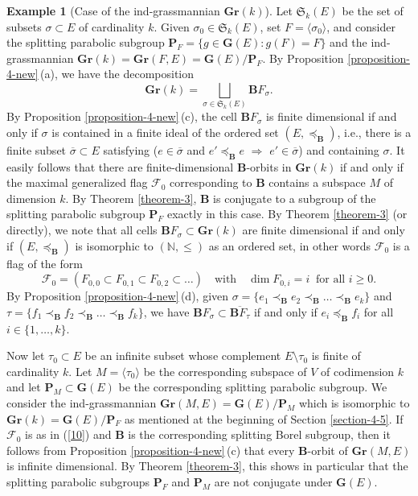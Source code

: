 \documentclass[12pt]{amsart}
\theoremstyle{definition}
\newtheorem{example}{Example}
\begin{document}
\begin{example}[Case of the ind-grassmannian $\mathbf{Gr}(k)$]
\label{example-2}
Let $\mathfrak{S}_k(E)$ be the set of subsets $\sigma\subset E$ of cardinality $k$.
Given $\sigma_0\in\mathfrak{S}_k(E)$,
set $F=\langle \sigma_0\rangle$, and consider the splitting parabolic subgroup $\mathbf{P}_F=\{g\in\mathbf{G}(E):g(F)=F\}$
and the ind-grassmannian $\mathbf{Gr}(k)=\mathbf{Gr}(F,E)=\mathbf{G}(E)/\mathbf{P}_F$.
 By Proposition \ref{proposition-4-new}\,{\rm (a)}, we have the decomposition
\[\mathbf{Gr}(k)=\bigsqcup_{\sigma\in\mathfrak{S}_k(E)}\mathbf{B}F_\sigma.\]
By Proposition \ref{proposition-4-new}\,{\rm (c)}, the cell $\mathbf{B}F_\sigma$ is finite dimensional if and only if $\sigma$ is contained in a finite ideal of the ordered set $(E,\preceq_\mathbf{B})$, i.e., there is a finite subset $\overline{\sigma}\subset E$ satisfying ($e\in \overline{\sigma}$ and $e'\preceq_\mathbf{B}e$ $\Rightarrow$ $e'\in\overline{\sigma}$) and containing $\sigma$.
It easily follows that there are finite-dimensional $\mathbf{B}$-orbits in $\mathbf{Gr}(k)$ if and only if  the maximal generalized flag $\mathcal{F}_0$ corresponding to $\mathbf{B}$ contains a subspace $M$ of dimension $k$.
By Theorem \ref{theorem-3}, $\mathbf{B}$ is conjugate to a subgroup of the splitting parabolic subgroup
$\mathbf{P}_F$
exactly in this case.
By Theorem \ref{theorem-3} (or directly), we note that
all cells $\mathbf{B}F_\sigma\subset\mathbf{Gr}(k)$ are finite dimensional if and only if $(E,\preceq_\mathbf{B})$ is isomorphic to $(\mathbb{N},\leq)$ as an ordered set, in other words $\mathcal{F}_0$ is a flag of the form
\begin{equation}
\label{10}
\mathcal{F}_0=(F_{0,0}\subset F_{0,1}\subset F_{0,2}\subset\ldots)\quad\mbox{with}\quad\dim F_{0,i}=i\ \mbox{ for all $i\geq 0$.}
\end{equation}
By Proposition \ref{proposition-4-new}\,{\rm (d)}, given $\sigma=\{e_1\prec_\mathbf{B}e_2\prec_\mathbf{B}\ldots\prec_\mathbf{B}e_k\}$
and $\tau=\{f_1\prec_\mathbf{B}f_2\prec_\mathbf{B}\ldots\prec_\mathbf{B}f_k\}$, we have $\mathbf{B}F_\sigma\subset\overline{\mathbf{B}F_\tau}$ if and only if $e_i\preceq_\mathbf{B}f_i$ for all $i\in\{1,\ldots,k\}$.

Now let $\tau_0\subset E$ be an infinite subset whose complement $E\setminus \tau_0$ is finite of cardinality $k$. Let $M=\langle\tau_0\rangle$ be the corresponding subspace of $V$ of codimension $k$ and let $\mathbf{P}_M\subset\mathbf{G}(E)$ be the corresponding splitting parabolic subgroup. We consider the ind-grassmannian $\mathbf{Gr}(M,E)=\mathbf{G}(E)/\mathbf{P}_M$ which is isomorphic to $\mathbf{Gr}(k)=\mathbf{G}(E)/\mathbf{P}_F$ as mentioned at the beginning of Section \ref{section-4-5}. If $\mathcal{F}_0$ is as in (\ref{10}) and $\mathbf{B}$ is the corresponding splitting Borel subgroup, then it follows from Proposition \ref{proposition-4-new}\,{\rm (c)} that every $\mathbf{B}$-orbit of $\mathbf{Gr}(M,E)$ is infinite dimensional. By Theorem \ref{theorem-3}, this shows in particular that the splitting parabolic subgroups $\mathbf{P}_F$ and $\mathbf{P}_M$ are not conjugate under $\mathbf{G}(E)$.
\end{example}
\end{document}
